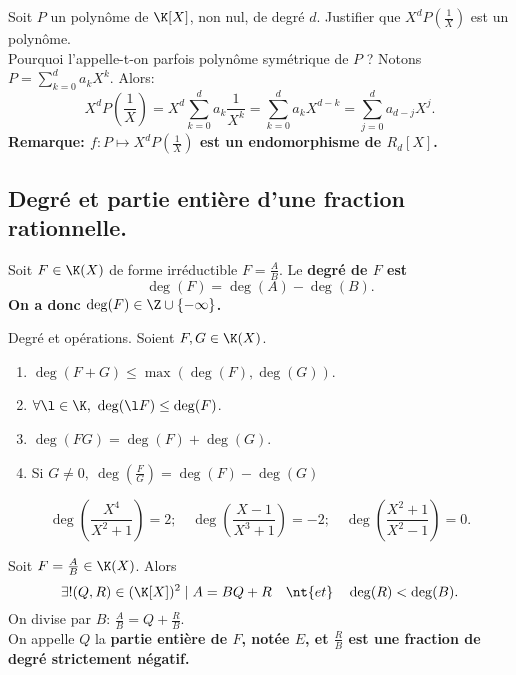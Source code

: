 \documentclass[11pt]{article}
\begin{document}
\begin{ex}{}{}
    Soit $P$ un polynôme de $\K[X]$, non nul, de degré $d$. Justifier que $X^dP(\frac{1}{X})$ est un polynôme.\\
    Pourquoi l'appelle-t-on parfois polynôme symétrique de $P$ ?
    \tcblower
    Notons $P=\sum_{k=0}^da_kX^k$. Alors:
    \begin{equation*}
        X^dP\left(\frac{1}{X}\right)=X^d\sum_{k=0}^da_k\frac{1}{X^k}=\sum_{k=0}^da_kX^{d-k}=\sum_{j=0}^da_{d-j}X^j.
    \end{equation*}
    \bf{Remarque:} $f:P\mapsto X^dP(\frac{1}{X})$ est un endomorphisme de $R_d[X]$.
\end{ex}

\subsection*{Degré et partie entière d'une fraction rationnelle.}

\begin{defi}{}{}
    Soit $F\in\K(X)$ de forme irréductible $F=\frac{A}{B}$. Le \bf{degré} de $F$ est
    \begin{equation*}
        \deg(F) = \deg(A) - \deg(B).
    \end{equation*}
    On a donc $\deg(F)\in\Z\cup\{-\infty\}$.
\end{defi}

\begin{prop}{Degré et opérations.}{}
    Soient $F,G\in\K(X)$.
    \begin{enumerate}[topsep=0pt,itemsep=-0.9 ex]
        \item $\deg(F+G)\leq\max(\deg(F),\deg(G))$.
        \item $\forall \l\in\K, ~ \deg(\l F)\leq \deg(F)$.
        \item $\deg(FG)=\deg(F)+\deg(G)$.
        \item Si $G\neq0, ~ \deg(\frac{F}{G}) = \deg(F) - \deg(G)$
    \end{enumerate}
\end{prop}

\begin{ex}{}{}
    \begin{equation*}
        \deg\left( \frac{X^4}{X^2+1} \right) = 2; \quad \deg\left( \frac{X-1}{X^3+1} \right) = -2; \quad \deg\left( \frac{X^2+1}{X^2-1} \right) = 0.
    \end{equation*}
\end{ex}

\begin{prop}{}{}
    Soit $F=\frac{A}{B}\in\K(X)$. Alors
    \begin{equation*}
        \exists!(Q,R)\in(\K[X])^2\mid A = BQ+R \quad \nt{et} \quad \deg(R)<\deg(B).
    \end{equation*}
    On divise par $B$: $\frac{A}{B}=Q+\frac{R}{B}$.\\
    On appelle $Q$ la \bf{partie entière} de $F$, notée $E$, et $\frac{R}{B}$ est une fraction de degré strictement négatif.
\end{prop}
\end{document}
